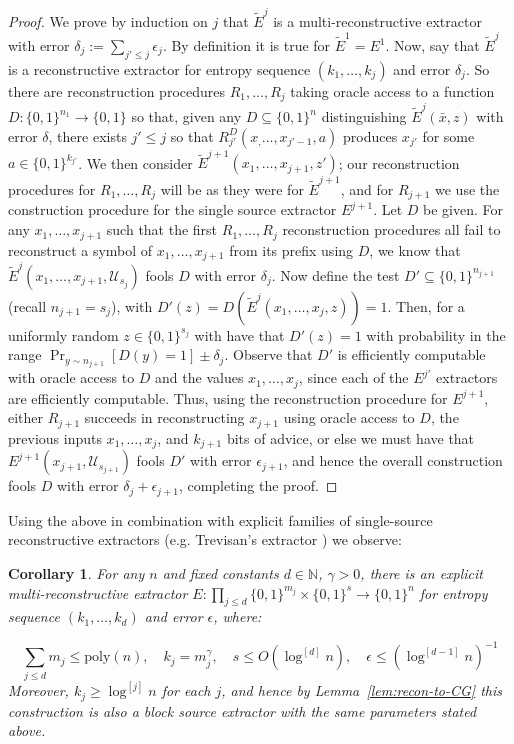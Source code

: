 \documentclass[11pt]{article}
\newtheorem{corollary}{Corollary}
\newcommand{\B}{\{0,1\}}
\renewcommand{\poly}{\mathrm{poly}}
\begin{document}
\begin{proof}
We prove by induction on $j$ that $\tilde{E}^j$ is a multi-reconstructive extractor with error $\delta_j:=\sum_{j' \leq j} \epsilon_j$. By definition it is true for $\tilde{E}^1 = E^1$. 
Now, say that $\tilde{E}^j$ is a reconstructive extractor for entropy sequence $(k_1,\ldots,k_j)$ and error $\delta_j$. So there are reconstruction procedures $R_1,\ldots,R_j$ taking oracle access to a function $D: \B^{n_1} \to \B$ so that, given any $D \subseteq \B^n$ distinguishing $\tilde{E}^{j}(\bar{x}, z)$ with error $\delta$, there exists $j' \leq j$ so that $R_{j'}^D(x_,\ldots,x_{j'-1}, a)$ produces $x_{j'}$ for some $a \in \B^{k_{j'}}$. We then consider $\tilde{E}^{j+1}(x_1,\ldots,x_{j+1},z')$; our reconstruction procedures for $R_1,\ldots,R_j$ will be as they were for $\tilde{E}^{j+1}$, and for $R_{j+1}$ we use the construction procedure for the single source extractor $E^{j+1}$. 
Let $D$ be given. For any $x_1,\ldots,x_{j+1}$ such that the first $R_1,\ldots,R_j$ reconstruction procedures all fail to reconstruct a symbol of $x_1,\ldots,x_{j+1}$ from its prefix using $D$, we know that $\tilde{E}^{j}(x_1,\ldots,x_{j+1}, \mathcal{U}_{s_j})$ fools $D$ with error $\delta_j$. Now define the test $D' \subseteq \B^{n_{j+1}}$ (recall $n_{j+1} = s_j$), with $D'(z)= D(\tilde{E}^{j}(x_1,\ldots,x_{j}, z))=1$. Then, for a uniformly random $z \in \B^{s_j}$ with have that $D'(z) = 1$ with probability in the range $\Pr_{y \sim n_{j+1}}[D(y)=1] \pm \delta_j$. Observe that $D'$ is efficiently computable with oracle access to $D$ and the values $x_1,\ldots,x_j$, since each of the $E^{j'}$ extractors are efficiently computable. Thus, using the reconstruction procedure for $E^{j+1}$, either $R_{j+1}$ succeeds in reconstructing $x_{j+1}$ using oracle access to $D$, the previous inputs $x_1,\ldots,x_j$, and $k_{j+1}$ bits of advice, or else we must have that $E^{j+1}(x_{j+1}, \mathcal{U}_{s_{j+1}})$ fools $D'$ with error $\epsilon_{j+1}$, and hence the overall construction fools $D$ with error $\delta_j + \epsilon_{j+1}$, completing the proof.
\end{proof}

Using the above in combination with explicit families of single-source reconstructive extractors (e.g. Trevisan's extractor \cite{trevisan}) we observe: 

\begin{corollary}
For any $n$ and fixed constants $d\in \mathbb{N}$, $\gamma >0$, there is an explicit multi-reconstructive extractor $E: \prod_{j \leq d} \B^{m_j} \times \B^s \to \B^n$ for entropy sequence $(k_1,\ldots,k_d)$ and error $\epsilon$, where: 

\[
\sum_{j\leq d} m_j \leq \poly(n), \quad k_j =  m_j^{\gamma}, \quad s \leq O(\log^{[d]}n), \quad \epsilon \leq (\log^{[d-1]}n)^{-1}
\]
Moreover, $k_j \geq \log^{[j]}n$ for each $j$, and hence by Lemma~\ref{lem:recon-to-CG} this construction is also a block source extractor with the same parameters stated above.
\end{corollary}
\end{document}
